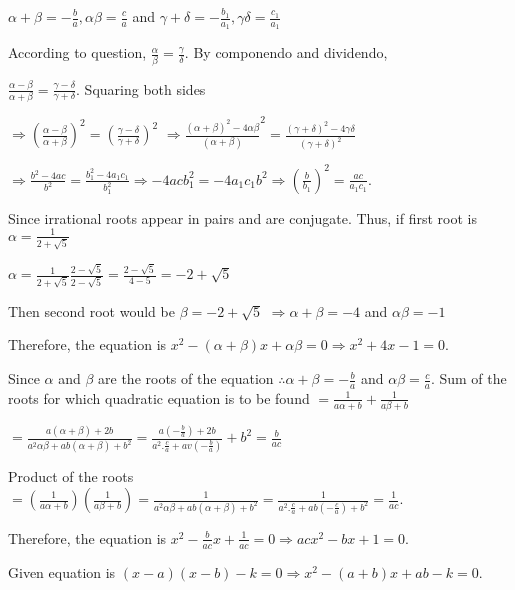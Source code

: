   $\alpha + \beta = -\frac{b}{a}, \alpha\beta = \frac{c}{a}$ and $\gamma + \delta = -\frac{b_1}{a_1},
  \gamma\delta = \frac{c_1}{a_1}$

  According to question, $\frac{\alpha}{\beta} = \frac{\gamma}{\delta}$. By componendo and dividendo,

  $\frac{\alpha - \beta}{\alpha + \beta} = \frac{\gamma - \delta}{\gamma + \delta}$. Squaring both sides

  $\Rightarrow \left(\frac{\alpha - \beta}{\alpha + \beta}\right)^2 = \left(\frac{\gamma - \delta}{\gamma +
    \delta}\right)^2$ $\Rightarrow \frac{(\alpha + \beta)^2 - 4\alpha\beta}{(\alpha + \beta)}^2 = \frac{(\gamma + \delta)^2 - 4\gamma\delta}{(\gamma +
      \delta)^2}$

  $\Rightarrow \frac{b^2 - 4ac}{b^2} = \frac{b_1^2 - 4a_1c_1}{b_1^2} \Rightarrow -4acb_1^2 = -4a_1c_1b^2 \Rightarrow
  \left(\frac{b}{b_1}\right)^2 = \frac{ac}{a_1c_1}$.
\item Since irrational roots appear in pairs and are conjugate. Thus, if first root is $\alpha = \frac{1}{2 + \sqrt{5}}$

  $\alpha = \frac{1}{2 + \sqrt{5}}\frac{2 - \sqrt{5}}{2 - \sqrt{5}} = \frac{2 - \sqrt{5}}{4 - 5} = -2 + \sqrt{5}$

  Then second root would be $\beta = -2 + \sqrt{5}$ $\Rightarrow \alpha + \beta = -4$ and $\alpha\beta = -1$

  Therefore, the equation is $x^2 - (\alpha + \beta)x + \alpha\beta = 0 \Rightarrow x^2 + 4x -1 = 0$.
\item Since $\alpha$ and $\beta$ are the roots of the equation $\therefore \alpha + \beta = -\frac{b}{a}$ and
  $\alpha\beta = \frac{c}{a}$. Sum of the roots for which quadratic equation is to be found $=
  \frac{1}{a\alpha + b} + \frac{1}{a\beta + b}$

  $= \frac{a(\alpha + \beta) + 2b}{a^2\alpha\beta + ab(\alpha + \beta) + b^2} = \frac{a\left(-\frac{b}{a}\right) +
    2b}{a^2.\frac{c}{a} + av\left(-\frac{b}{a}\right)} + b^2 = \frac{b}{ac}$

  Product of the roots $= \left(\frac{1}{a\alpha + b}\right)\left(\frac{1}{a\beta + b}\right) =
  \frac{1}{a^2\alpha\beta + ab(\alpha + \beta) + b^2} = \frac{1}{a^2.\frac{c}{a} +
    ab\left(-\frac{c}{a}\right) + b^2} = \frac{1}{ac}$.

  Therefore, the equation is $x^2 - \frac{b}{ac}x + \frac{1}{ac} = 0 \Rightarrow acx^2 - bx + 1 = 0$.
\item Given equation is $(x - a)(x - b) - k = 0 \Rightarrow x^2 - (a + b)x + ab - k = 0$.

